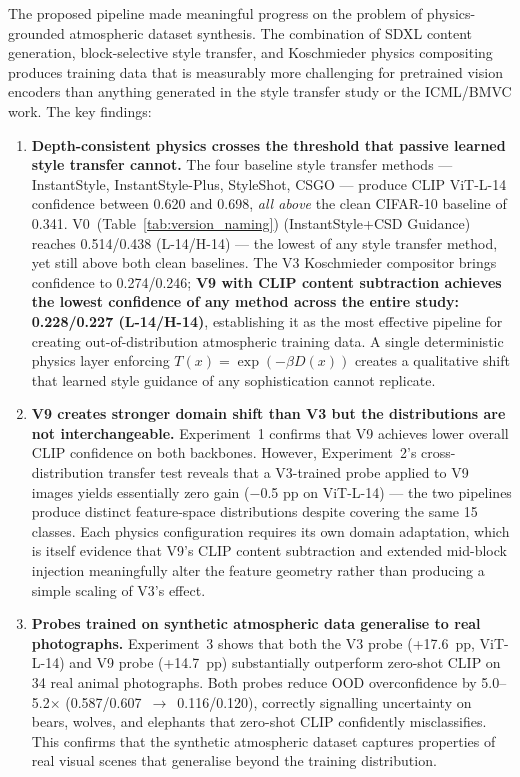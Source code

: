 \noindent The proposed pipeline made meaningful progress on the problem of physics-grounded atmospheric dataset synthesis. The combination of SDXL content generation, block-selective style transfer, and Koschmieder physics compositing produces training data that is measurably more challenging for pretrained vision encoders than anything generated in the style transfer study or the ICML/BMVC work. The key findings:

\begin{enumerate}
    \item \textbf{Depth-consistent physics crosses the threshold that passive learned style transfer cannot.} The four baseline style transfer methods --- InstantStyle, InstantStyle-Plus, StyleShot, CSGO --- produce CLIP ViT-L-14 confidence between 0.620 and 0.698, \emph{all above} the clean CIFAR-10 baseline of 0.341. V0~(Table~\ref{tab:version_naming}) (InstantStyle+CSD Guidance) reaches 0.514/0.438 (L-14/H-14) --- the lowest of any style transfer method, yet still above both clean baselines. The V3 Koschmieder compositor brings confidence to 0.274/0.246; \textbf{V9 with CLIP content subtraction achieves the lowest confidence of any method across the entire study: 0.228/0.227 (L-14/H-14)}, establishing it as the most effective pipeline for creating out-of-distribution atmospheric training data. A single deterministic physics layer enforcing $T(x) = \exp(-\beta D(x))$ creates a qualitative shift that learned style guidance of any sophistication cannot replicate.

    \item \textbf{V9 creates stronger domain shift than V3 but the distributions are not interchangeable.} Experiment~1 confirms that V9 achieves lower overall CLIP confidence on both backbones. However, Experiment~2's cross-distribution transfer test reveals that a V3-trained probe applied to V9 images yields essentially zero gain ($-$0.5 pp on ViT-L-14) — the two pipelines produce distinct feature-space distributions despite covering the same 15 classes. Each physics configuration requires its own domain adaptation, which is itself evidence that V9's CLIP content subtraction and extended mid-block injection meaningfully alter the feature geometry rather than producing a simple scaling of V3's effect.

    \item \textbf{Probes trained on synthetic atmospheric data generalise to real photographs.} Experiment~3 shows that both the V3 probe (+17.6~pp, ViT-L-14) and V9 probe (+14.7~pp) substantially outperform zero-shot CLIP on 34 real animal photographs. Both probes reduce OOD overconfidence by 5.0--5.2$\times$ (0.587/0.607~$\rightarrow$~0.116/0.120), correctly signalling uncertainty on bears, wolves, and elephants that zero-shot CLIP confidently misclassifies. This confirms that the synthetic atmospheric dataset captures properties of real visual scenes that generalise beyond the training distribution.


\end{enumerate}
